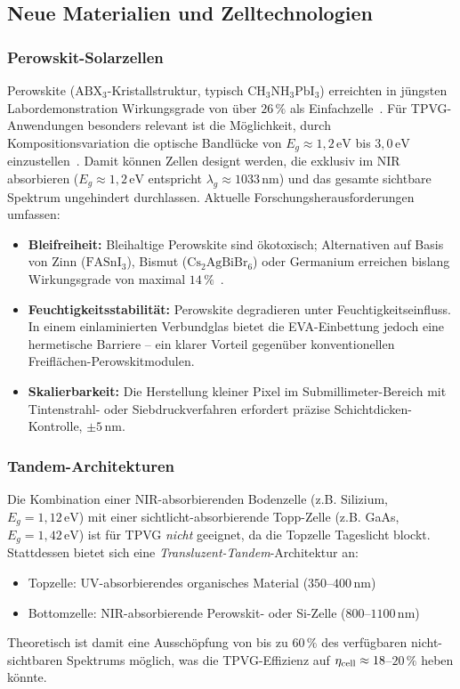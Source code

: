 ﻿\documentclass[a4paper,12pt]{article}
\theoremstyle{definition}
\theoremstyle{remark}
\begin{document}
\subsection{Neue Materialien und Zelltechnologien}

\subsubsection{Perowskit-Solarzellen}
Perowskite ($\mathrm{ABX_3}$-Kristallstruktur, typisch
$\mathrm{CH_3NH_3PbI_3}$) erreichten in jüngsten Labordemonstration
Wirkungsgrade von über $26\,\%$ als Einfachzelle~\cite{NREL2024}. Für
TPVG-Anwen\-dungen besonders relevant ist die Möglichkeit, durch
Kompositionsvariation die optische Bandlücke von $E_g \approx 1{,}2\,\mathrm{eV}$
bis $3{,}0\,\mathrm{eV}$ einzustellen~\cite{Noh2013}. Damit können Zellen
designt werden, die exklusiv im NIR absorbieren ($E_g \approx 1{,}2\,\mathrm{eV}$
entspricht $\lambda_g \approx 1033\,\mathrm{nm}$) und das gesamte sichtbare
Spektrum ungehindert durchlassen. Aktuelle Forschungsherausforderungen umfassen:
\begin{itemize}
  \item \textbf{Bleifreiheit:} Bleihaltige Perowskite sind ökotoxisch;
    Alternativen auf Basis von Zinn ($\mathrm{FASnI_3}$), Bismut
    ($\mathrm{Cs_2AgBiBr_6}$) oder Germanium erreichen bislang
    Wirkungsgrade von maximal $14\,\%$~\cite{Krishnamoorthy2015}.
  \item \textbf{Feuchtigkeitsstabilität:} Perowskite degradieren unter
    Feuchtigkeitseinfluss. In einem einlaminierten Verbundglas bietet die
    EVA-Einbettung jedoch eine hermetische Barriere -- ein klarer Vorteil
    gegenüber konventionellen Freiflächen-Perowskitmodu\-len.
  \item \textbf{Skalierbarkeit:} Die Herstellung kleiner Pixel im
    Submillimeter-Bereich mit Tinten\-strahl- oder Siebdruckverfahren
    erfordert präzise Schichtdicken-Kon\-trol\-le, $\pm 5\,\mathrm{nm}$.
\end{itemize}

\subsubsection{Tandem-Architekturen}
Die Kombination einer NIR-absorbierenden Bodenzelle (z.B. Silizium,
$E_g = 1{,}12\,\mathrm{eV}$) mit einer sichtlicht-absorbierende Topp-Zelle
(z.B. GaAs, $E_g = 1{,}42\,\mathrm{eV}$) ist für TPVG \emph{nicht}
geeignet, da die Topzelle Tageslicht blockt. Stattdessen bietet sich eine
\emph{Transluzent-Tandem}-Architektur an:
\begin{itemize}
  \item Topzelle: UV-absorbierendes organisches Material
    ($350$--$400\,\mathrm{nm}$)
  \item Bottomzelle: NIR-absorbierende Perowskit- oder Si-Zelle
    ($800$--$1100\,\mathrm{nm}$)
\end{itemize}
Theoretisch ist damit eine Ausschöpfung von bis zu $60\,\%$ des
verfügbaren nicht-sichtbaren Spektrums möglich, was die TPVG-Effizienz
auf $\eta_{\rm cell} \approx 18$--$20\,\%$ heben könnte.
\end{document}

